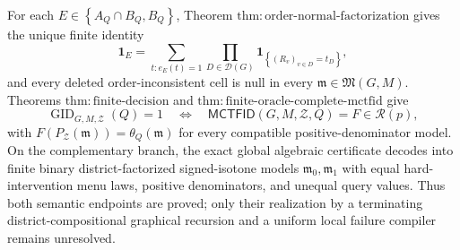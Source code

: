 For each \(E\in\left\lbrace A_Q\cap B_Q,B_Q\right\rbrace\), Theorem \(\mathrm{thm:order\text{-}normal\text{-}factorization}\) gives the unique finite identity
\[
 \mathbf 1_E
 =\sum_{t:e_E(t)=1}\prod_{D\in\mathcal D(G)}
   \mathbf 1_{\left\lbrace (R_v)_{v\in D}=t_D\right\rbrace},
\]
and every deleted order-inconsistent cell is null in every \(\mathfrak m\in\mathfrak M(G,M)\). Theorems \(\mathrm{thm:finite\text{-}decision}\) and \(\mathrm{thm:finite\text{-}oracle\text{-}complete\text{-}mctfid}\) give
\[
 \operatorname{GID}_{G,M,\mathcal Z}(Q)=1
 \quad\Longleftrightarrow\quad
 \mathsf{MCTFID}(G,M,\mathcal Z,Q)=F\in\mathcal R(p),
\]
with \(F(P_{\mathcal Z}(\mathfrak m))=\theta_Q(\mathfrak m)\) for every compatible positive-denominator model. On the complementary branch, the exact global algebraic certificate decodes into finite binary district-factorized signed-isotone models \(\mathfrak m_0,\mathfrak m_1\) with equal hard-intervention menu laws, positive denominators, and unequal query values. Thus both semantic endpoints are proved; only their realization by a terminating district-compositional graphical recursion and a uniform local failure compiler remains unresolved.